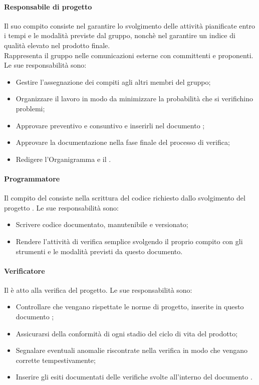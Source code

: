 \paragraph{Responsabile di progetto}
Il suo compito consiste nel garantire lo svolgimento delle attività pianificate entro i tempi e le modalità previste dal gruppo, nonchè nel garantire un indice di qualità elevato nel prodotto finale. \\
Rappresenta il gruppo \groupName{} nelle comunicazioni esterne con committenti e proponenti. Le sue responsabilità sono:
\begin{itemize}
	\item Gestire l'assegnazione dei compiti agli altri membri del gruppo;
	\item Organizzare il lavoro in modo da minimizzare la probabilità che si verifichino problemi;
	\item Approvare preventivo e consuntivo e inserirli nel documento \docNameVersionPdP;
	\item Approvare la documentazione nella fase finale del processo di verifica;
	\item Redigere l'Organigramma e il \docNameVersionPdP.
\end{itemize}


\paragraph{Programmatore}
Il compito del \roleProgrammer{} consiste nella scrittura del codice richiesto dallo svolgimento del progetto \projectName. Le sue responsabilità sono:
\begin{itemize}
	
	\item Scrivere codice documentato, manutenibile e versionato;
	\item Rendere l'attività di verifica semplice svolgendo il proprio compito con gli strumenti e le modalità previsti da questo documento.
\end{itemize}

\paragraph{Verificatore}
Il \roleVerifier{} è atto alla verifica del progetto. 
Le sue responsabilità sono: 
\begin{itemize}
	\item Controllare che vengano rispettate le norme di progetto, inserite in questo documento \docNameVersionNdP{};
	\item Assicurarsi della conformità di ogni stadio del ciclo di vita del prodotto;
	\item Segnalare eventuali anomalie riscontrate nella verifica in modo che vengano corrette tempestivamente;
	\item Inserire gli esiti documentati delle verifiche svolte all'interno del documento \docNameVersionPdQ.
\end{itemize}

